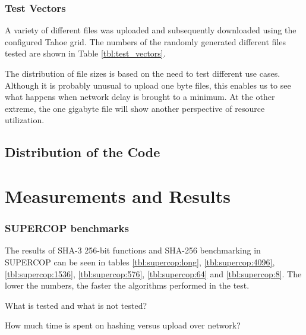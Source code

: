 \documentclass[english,12pt,a4paper]{book}
\begin{document}
\subsection{Test Vectors}

A variety of different files was uploaded and subsequently downloaded using the
configured Tahoe grid. The numbers of the randomly generated different files
tested are shown in Table \ref{tbl:test_vectors}.



The distribution of file sizes is based on the need to test different use cases.
Although it is probably unusual to upload one byte files, this enables us to see
what happens when network delay is brought to a minimum. At the other extreme,
the one gigabyte file will show another perspective of resource utilization.


\section{Distribution of the Code}

\chapter{Measurements and Results}



\subsection{\ac{SUPERCOP} benchmarks}
The results of \ac{SHA}-3
256-bit functions and \ac{SHA}-256 benchmarking in \ac{SUPERCOP} can be seen in
tables \ref{tbl:supercop:long}, \ref{tbl:supercop:4096},
\ref{tbl:supercop:1536}, \ref{tbl:supercop:576}, \ref{tbl:supercop:64} and
\ref{tbl:supercop:8}. The lower the numbers, the faster the algorithms
performed in the test.








What is tested and what is not tested?

How much time is spent on hashing versus upload over network?
\end{document}
